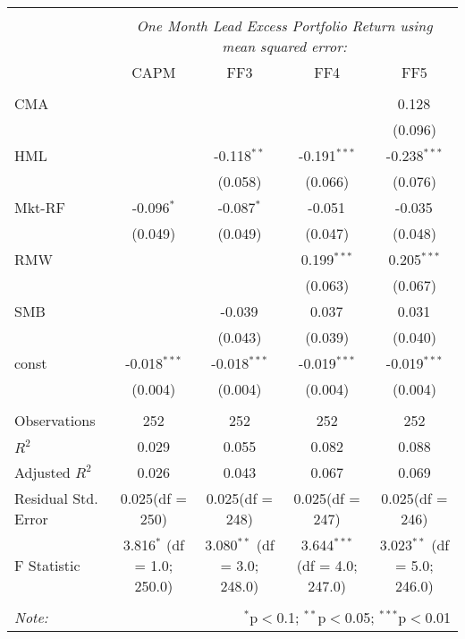 \begin{table}[!htbp] \centering
\begin{tabular}{@{\extracolsep{5pt}}lcccc}
\\[-1.8ex]\hline
\hline \\[-1.8ex]
& \multicolumn{4}{c}{\textit{One Month Lead Excess Portfolio Return using mean squared error:}} \
\cr \cline{4-5}
\\[-1.8ex] & CAPM & FF3 & FF4 & FF5 \\
\hline \\[-1.8ex]
 CMA & & & & 0.128$^{}$ \\
  & & & & (0.096) \\
 HML & & -0.118$^{**}$ & -0.191$^{***}$ & -0.238$^{***}$ \\
  & & (0.058) & (0.066) & (0.076) \\
 Mkt-RF & -0.096$^{*}$ & -0.087$^{*}$ & -0.051$^{}$ & -0.035$^{}$ \\
  & (0.049) & (0.049) & (0.047) & (0.048) \\
 RMW & & & 0.199$^{***}$ & 0.205$^{***}$ \\
  & & & (0.063) & (0.067) \\
 SMB & & -0.039$^{}$ & 0.037$^{}$ & 0.031$^{}$ \\
  & & (0.043) & (0.039) & (0.040) \\
 const & -0.018$^{***}$ & -0.018$^{***}$ & -0.019$^{***}$ & -0.019$^{***}$ \\
  & (0.004) & (0.004) & (0.004) & (0.004) \\
\hline \\[-1.8ex]
 Observations & 252 & 252 & 252 & 252 \\
 $R^2$ & 0.029 & 0.055 & 0.082 & 0.088 \\
 Adjusted $R^2$ & 0.026 & 0.043 & 0.067 & 0.069 \\
 Residual Std. Error & 0.025(df = 250) & 0.025(df = 248) & 0.025(df = 247) & 0.025(df = 246)  \\
 F Statistic & 3.816$^{*}$ (df = 1.0; 250.0) & 3.080$^{**}$ (df = 3.0; 248.0) & 3.644$^{***}$ (df = 4.0; 247.0) & 3.023$^{**}$ (df = 5.0; 246.0) \\
\hline
\hline \\[-1.8ex]
\textit{Note:} & \multicolumn{4}{r}{$^{*}$p$<$0.1; $^{**}$p$<$0.05; $^{***}$p$<$0.01} \\
\end{tabular}
\end{table}
